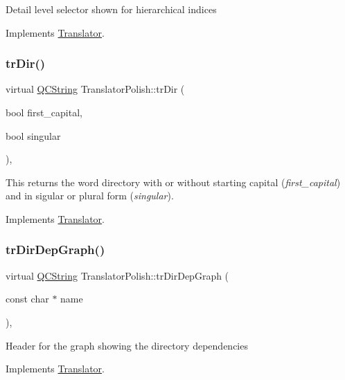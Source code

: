 Detail level selector shown for hierarchical indices 

Implements \mbox{\hyperlink{class_translator}{Translator}}.

\mbox{\label{class_translator_polish_afb7f5a136927d3c97c329726db732650}} 
\subsubsection{\texorpdfstring{trDir()}{trDir()}}
{\footnotesize\ttfamily virtual \mbox{\hyperlink{class_q_c_string}{Q\+C\+String}} Translator\+Polish\+::tr\+Dir (\begin{DoxyParamCaption}\item[{bool}]{first\+\_\+capital,  }\item[{bool}]{singular }\end{DoxyParamCaption})\hspace{0.3cm}{\ttfamily [inline]}, {\ttfamily [virtual]}}

This returns the word directory with or without starting capital ({\itshape first\+\_\+capital}) and in sigular or plural form ({\itshape singular}). 

Implements \mbox{\hyperlink{class_translator}{Translator}}.

\mbox{\label{class_translator_polish_a7b093f74dfcc7c465737d62c02b91ba3}} 
\subsubsection{\texorpdfstring{trDirDepGraph()}{trDirDepGraph()}}
{\footnotesize\ttfamily virtual \mbox{\hyperlink{class_q_c_string}{Q\+C\+String}} Translator\+Polish\+::tr\+Dir\+Dep\+Graph (\begin{DoxyParamCaption}\item[{const char $\ast$}]{name }\end{DoxyParamCaption})\hspace{0.3cm}{\ttfamily [inline]}, {\ttfamily [virtual]}}

Header for the graph showing the directory dependencies 

Implements \mbox{\hyperlink{class_translator}{Translator}}.

